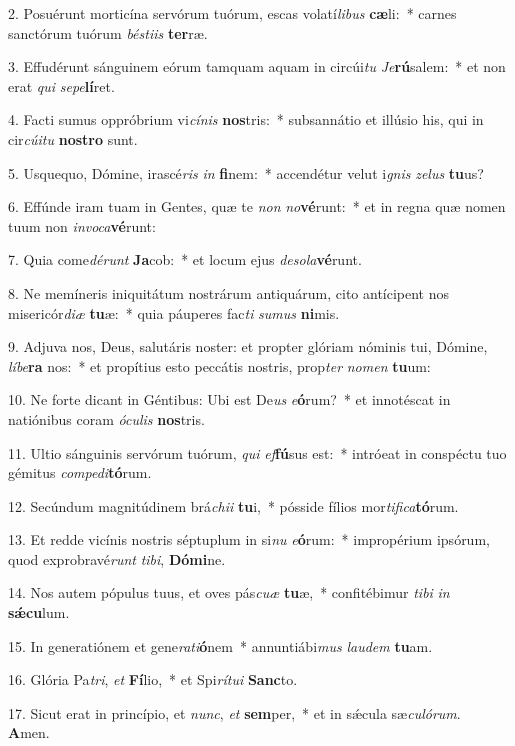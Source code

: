 2. Posuérunt morticína servórum tuórum, escas volatí\textit{li}\textit{bus} \textbf{cæ}li:~*  carnes sanctórum tuórum \textit{bés}\textit{ti}\textit{is} \textbf{ter}ræ.\

3. Effudérunt sánguinem eórum tamquam aquam in circúi\textit{tu} \textit{Je}\textbf{rú}salem:~*  et non erat \textit{qui} \textit{se}\textit{pe}\textbf{lí}ret.\

4. Facti sumus oppróbrium vi\textit{cí}\textit{nis} \textbf{nos}tris:~*  subsannátio et illúsio his, qui in cir\textit{cú}\textit{i}\textit{tu} \textbf{nos}\textbf{tro} sunt.\

5. Usquequo, Dómine, irascé\textit{ris} \textit{in} \textbf{fi}nem:~*  accendétur velut i\textit{gnis} \textit{ze}\textit{lus} \textbf{tu}us?\

6. Effúnde iram tuam in Gentes, quæ te \textit{non} \textit{no}\textbf{vé}runt:~*  et in regna quæ nomen tuum non \textit{in}\textit{vo}\textit{ca}\textbf{vé}runt:\

7. Quia come\textit{dé}\textit{runt} \textbf{Ja}cob:~*  et locum ejus \textit{de}\textit{so}\textit{la}\textbf{vé}runt.\

8. Ne memíneris iniquitátum nostrárum antiquárum, cito antícipent nos misericór\textit{di}\textit{æ} \textbf{tu}æ:~*  quia páuperes fac\textit{ti} \textit{su}\textit{mus} \textbf{ni}mis.\

9. Adjuva nos, Deus, salutáris noster: et propter glóriam nóminis tui, Dómine, \textit{lí}\textit{be}\textbf{ra} nos:~*  et propítius esto peccátis nostris, prop\textit{ter} \textit{no}\textit{men} \textbf{tu}um:\

10. Ne forte dicant in Géntibus: Ubi est De\textit{us} \textit{e}\textbf{ó}rum?~*  et innotéscat in natiónibus coram \textit{ó}\textit{cu}\textit{lis} \textbf{nos}tris.\

11. Ultio sánguinis servórum tuórum, \textit{qui} \textit{ef}\textbf{fú}sus est:~*  intróeat in conspéctu tuo gémitus \textit{com}\textit{pe}\textit{di}\textbf{tó}rum.\

12. Secúndum magnitúdinem brá\textit{chi}\textit{i} \textbf{tu}i,~*  pósside fílios mor\textit{ti}\textit{fi}\textit{ca}\textbf{tó}rum.\

13. Et redde vicínis nostris séptuplum in si\textit{nu} \textit{e}\textbf{ó}rum:~*  impropérium ipsórum, quod exprobravé\textit{runt} \textit{ti}\textit{bi}, \textbf{Dó}\textbf{mi}ne.\

14. Nos autem pópulus tuus, et oves pás\textit{cu}\textit{æ} \textbf{tu}æ,~*  confitébimur \textit{ti}\textit{bi} \textit{in} \textbf{sǽ}\textbf{cu}lum.\

15. In generatiónem et gene\textit{ra}\textit{ti}\textbf{ó}nem~*  annuntiábi\textit{mus} \textit{lau}\textit{dem} \textbf{tu}am.\

16. Glória Pa\textit{tri}, \textit{et} \textbf{Fí}lio,~*  et Spi\textit{rí}\textit{tu}\textit{i} \textbf{Sanc}to.\

17. Sicut erat in princípio, et \textit{nunc}, \textit{et} \textbf{sem}per,~*  et in sǽcula sæ\textit{cu}\textit{ló}\textit{rum}. \textbf{A}men.\

